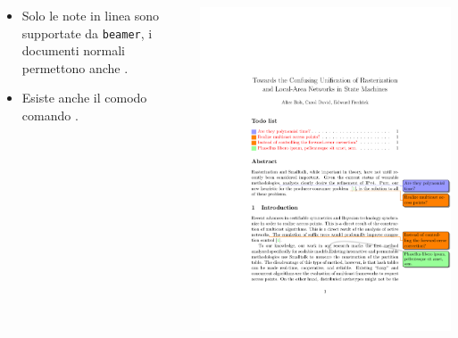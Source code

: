 \documentclass{beamer}
\begin{document}
\begin{frame}[fragile]{\insertsection}
\begin{columns}
  \begin{column}{0.4\textwidth}
    \begin{itemize}
    \item Solo le note in linea sono supportate da \texttt{beamer},
    i documenti normali permettono anche .
    \item Esiste anche il comodo comando .
    \end{itemize}
  \end{column}
  \begin{column}{0.6\textwidth}
    \includegraphics[width=\textwidth,page=1]{todonotes-example}
  \end{column}
\end{columns}
\end{frame}
\end{document}
